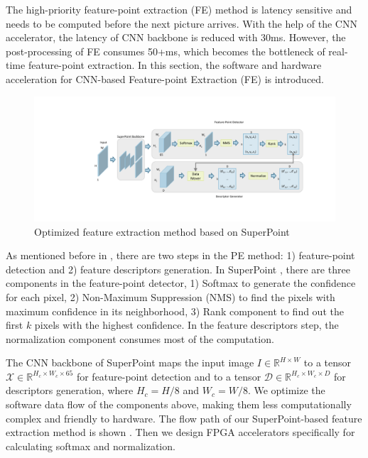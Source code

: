 \label{sec:hardsoftcodesign}
\label{subsec:FEopt}

The high-priority feature-point extraction (FE) method is latency sensitive and needs to be computed before the next picture arrives. With the help of the CNN accelerator, the latency of CNN backbone is reduced with 30ms. However, the  post-processing of FE consumes 50+ms, which becomes the bottleneck of real-time feature-point extraction. In this section, the software and hardware acceleration for CNN-based Feature-point Extraction (FE) is introduced.


\begin{figure}[t]
    \centering  
    \includegraphics[width=1\linewidth]{fig/superpoint.pdf}
    \caption{Optimized feature extraction method based on SuperPoint}
    \label{fig:superpoint}
\end{figure}

As mentioned before in , there are two steps in the PE method: 1) feature-point detection and 2) feature descriptors generation. 
In SuperPoint \cite{detone2018superpoint}, there are three components in the feature-point detector, 1) Softmax to generate the confidence for each pixel, 2) Non-Maximum Suppression (NMS) to find the pixels with maximum confidence in its neighborhood, 3) Rank component to find out the first $k$ pixels with the highest confidence. 
In the feature descriptors step, the normalization component consumes most of the computation. 

The CNN backbone of SuperPoint maps the input image $I\in \mathbb{R}^{H\times W}$ to a tensor $\mathcal{X}\in \mathbb{R}^{H_c\times W_c\times 65}$ for feature-point detection and to a tensor $\mathcal{D}\in \mathbb{R}^{H_c\times W_c\times D}$ for descriptors generation, where $H_c = H/8$ and $W_c = W/8$.
We optimize the software data flow of the components above, making them less computationally complex and friendly to hardware. 
The flow path of our SuperPoint-based feature extraction method is shown . 
Then we design FPGA accelerators specifically for calculating softmax and normalization.

